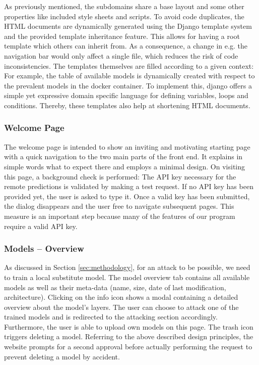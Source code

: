 As previously mentioned, the subdomains share a base layout and some other properties like included style sheets and scripts.
To avoid code duplicates, the HTML documents are dynamically generated using the Django template system and the provided template inheritance feature.
This allows for having a root template which others can inherit from.
As a consequence, a change in e.g. the navigation bar would only affect a single file, which reduces the risk of code inconsistencies.
The templates themselves are filled according to a given context: For example, the table of available models is dynamically created with respect to the prevalent models in the docker container.
To implement this, django offers a simple yet expressive domain specific language for defining variables, loops and conditions.
Thereby, these templates also help at shortening HTML documents.

\subsubsection{Welcome Page}
The welcome page is intended to show an inviting and motivating starting page with a quick navigation to the two main parts of the front end.
It explains in simple words what to expect there and employs a minimal design.
On visiting this page, a background check is performed: The API key necessary for the remote predictions is validated by making a test request.
If no API key has been provided yet, the user is asked to type it.
Once a valid key has been submitted, the dialog disappears and the user free to navigate subsequent pages.
This measure is an important step because many of the features of our program require a valid API key.

\subsubsection{Models -- Overview}
As discussed in Section \ref{sec:methodology}, for an attack to be possible, we need to train a local substitute model.
The model overview tab contains all available models as well as their meta-data (name, size, date of last modification, architecture).
Clicking on the info icon shows a modal containing a detailed overview about the model's layers.
The user can choose to attack one of the trained models and is redirected to the attacking section accordingly. 
Furthermore, the user is able to upload own models on this page.
The trash icon triggers deleting a model.
Referring to the above described design principles, the website prompts for a second approval before actually performing the request to prevent deleting a model by accident.

